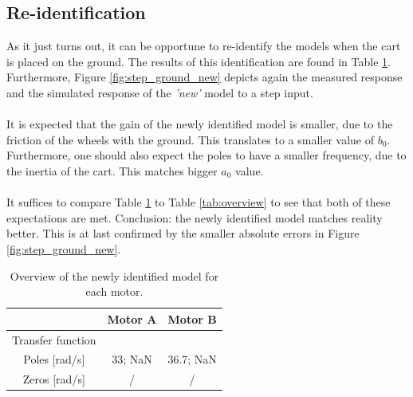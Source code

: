 \documentclass[a4paper,kul]{kulakarticle} %
\begin{document}

\subsection{Re-identification}

As it just turns out, it can be opportune to re-identify the models when the cart is placed on the ground. The results of this identification are found in Table \ref{tab:overview_re}. Furthermore, Figure \ref{fig:step_ground_new} depicts again the measured response and the simulated response of the \textit{'new'} model to a step input. 
\\\\
It is expected that the gain of the newly identified model is smaller, due to the friction of the wheels with the ground. This translates to a smaller value of $b_0$. Furthermore, one should also expect the poles to have a smaller frequency, due to the inertia of the cart. This matches bigger $a_0$ value.
\\\\
It suffices to compare Table \ref{tab:overview_re} to Table \ref{tab:overview} to see that both of these expectations are met. Conclusion: the newly identified model matches reality better. This is at last confirmed by the smaller absolute errors in Figure \ref{fig:step_ground_new}.


\begin{table}[htp]
	\centering
	\caption{Overview of the newly identified model for each motor.}
	\label{tab:overview_re}
	\bgroup
	\def\arraystretch{1.8}
	\begin{tabular}{|c||c|c|}
		\hline & \textbf{Motor A} & \textbf{Motor B}
		\\ \hline \hline
		Transfer function & \scalebox{1.15}{$\frac{ 0.5689}{z^2 - 0.7191\text{ }z}$} & \scalebox{1.15}{$\frac{ 0.6164}{z^2 - 0.6928\text{ }z}$}
		\\ \hline
		Poles [rad/s] & 33; NaN & 36.7; NaN
		\\ \hline
		Zeros [rad/s] & / & /
		\\ \hline
	\end{tabular}
	\egroup
\end{table}
\end{document}
